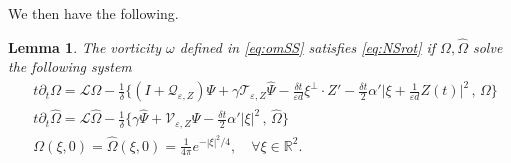 \documentclass[11pt,reqno,a4paper]{amsart}
\def\eps{\varepsilon}
\def\de{{\partial}}
\def\R {\mathbb{R}} %
\newcommand{\cL}{\mathcal{L}}
\newcommand{\cQ}{\mathcal{Q}}
\newcommand{\cT}{\mathcal{T}}
\newcommand{\cV}{\mathcal{V}}
\newcommand{\1}{\mathbbm{1}}
\newtheorem{lemma}[proposition]{Lemma}
\theoremstyle{definition}
\theoremstyle{definition}
\numberwithin{equation}{section}
\begin{document}
We then have the following.
\begin{lemma}
\label{lem:derivationequation}
    The vorticity $\omega$ defined in \cref{eq:omSS} satisfies \cref{eq:NSrot} if $\Omega,\widehat{\Omega}$ solve the following system
\begin{align}
    \label{eq:Omega}&t\de_t \Omega=\cL\Omega-\frac{1}{\delta}\Big\{(I+\cQ_{\eps,Z})\Psi+\gamma \cT_{\eps,Z}\widehat{\Psi}-\frac{\delta t}{ \eps d}\xi^\perp\cdot Z'- \frac{\delta t}{2}\alpha'\big|\xi+\frac{1}{\eps d}Z(t)\big|^2 \, , \, \Omega\Big\}\\
    \label{eq:P}&t\de_t \widehat{\Omega}=\cL \widehat{\Omega}-\frac{1}{\delta}\Big\{\gamma \widehat{\Psi}+\cV_{\eps,Z} \Psi-\frac{\delta t}{2} \alpha'|\xi|^2 \, , \, \widehat{\Omega}\Big\} \\
    \label{eq:Init}& \Omega(\xi,0) = \widehat{\Omega}(\xi,0) = \frac{1}{4\pi} e^{-|\xi|^2/4}, \quad \forall \xi \in \R^2.
\end{align}
\end{lemma}
\end{document}
